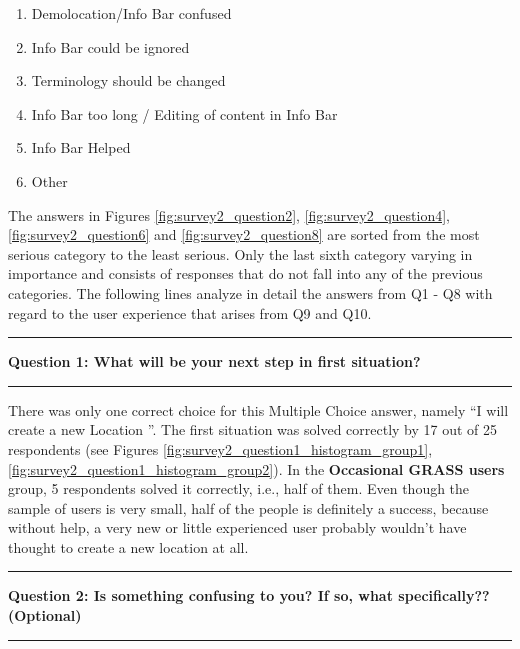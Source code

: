 \documentclass[a4paper,10pt,twoside]{article}
\begin{document}
\begin{enumerate}
\item Demolocation/Info Bar confused
\item Info Bar could be ignored
\item Terminology should be changed
\item Info Bar too long / Editing of content in Info Bar
\item Info Bar Helped
\item Other
\end{enumerate}

\noindent The answers in Figures \ref{fig:survey2_question2}, \ref{fig:survey2_question4}, \ref{fig:survey2_question6} and \ref{fig:survey2_question8} are sorted from the most serious category to the least serious. Only the last sixth category varying in importance and consists of responses that do not fall into any of the previous categories. The following lines analyze in detail the answers from Q1 - Q8 with regard to the user experience that arises from Q9 and Q10.

\par\noindent\rule{\textwidth}{0.4pt}
\noindent \textbf{Question 1: What will be your next step in first situation?}
\par\noindent\rule{\textwidth}{0.4pt}

\noindent There was only one correct choice for this Multiple Choice answer, namely ``I will create a new Location ''. The first situation was solved correctly by 17 out of 25 respondents (see Figures \ref{fig:survey2_question1_histogram_group1}, \ref{fig:survey2_question1_histogram_group2}). In the \textbf{Occasional GRASS users} group, 5 respondents solved it correctly, i.e., half of them. Even though the sample of users is very small, half of the people is definitely a success, because without help, a very new or little experienced user probably wouldn't have thought to create a new location at all.

\par\noindent\rule{\textwidth}{0.4pt}
\noindent \textbf{Question 2: Is something confusing to you? If so, what specifically?? (Optional)}
\par\noindent\rule{\textwidth}{0.4pt}
\end{document}
